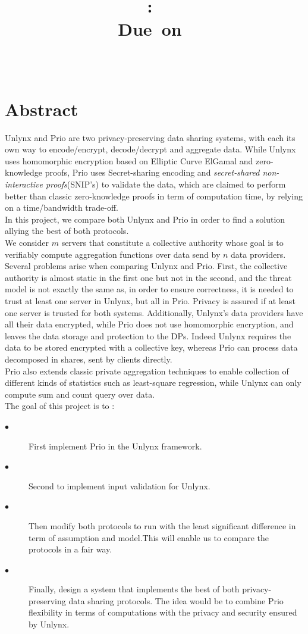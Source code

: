 \documentclass{article}
\title{
\logoepfl
\vspace{2in}
\textmd{\textbf{\hmwkClass:\ \hmwkTitle}}\\
\normalsize\vspace{0.1in}\small{Due\ on\ \hmwkDueDate}\\
\vspace{0.1in}\large{\textit{\hmwkClassInstructor\ \hmwkClassTime}}
\author{\textbf{\hmwkAuthorName}}
\vspace{3in}
}
\begin{document}
\maketitle

\newpage
\section*{Abstract}
Unlynx and Prio are two privacy-preserving data sharing systems, with each its own way to encode/encrypt, decode/decrypt and aggregate data. While Unlynx \cite{unlynx} uses homomorphic encryption based on Elliptic Curve ElGamal and zero-knowledge proofs, Prio \cite{prio} uses Secret-sharing encoding and \textit{secret-shared non-interactive proofs}(SNIP's) to validate the data, which are claimed to perform better than classic zero-knowledge proofs \cite{proof1,proof2} in term of computation time, by relying on a time/bandwidth trade-off.\\
In this project, we compare both Unlynx and Prio in order to find a solution allying the best of both protocols.\\
We consider $m$ servers that constitute a collective authority whose goal is to verifiably compute aggregation functions over data send by $n$ data providers.\\
Several problems arise when comparing Unlynx and Prio. First, the collective authority is almost static in the first one but not in the second, and the threat model is not exactly the same as, in order to ensure correctness, it is needed to trust at least one server in Unlynx, but all in Prio. Privacy is assured if at least one server is trusted for both systems. Additionally, Unlynx's data providers have all their data encrypted, while Prio does not use homomorphic encryption, and leaves the data storage and protection to the DPs. Indeed Unlynx requires the data to be stored encrypted with a collective key, whereas Prio can process data decomposed in shares, sent by clients directly.\\
Prio also extends classic private aggregation techniques to enable collection of different kinds of statistics such as least-square regression, while Unlynx can only compute sum and count query over data.\\
The goal of this project is to :
\begin{description}
\item[$\bullet$] First implement Prio in the Unlynx framework.
\item[$\bullet$] Second to implement input validation for Unlynx.
\item[$\bullet$]{Then modify both protocols to run with the least significant difference in term of assumption and model.This will enable us to compare the protocols in a fair way.}
\item[$\bullet$] Finally, design a system that implements the best of both privacy-preserving data sharing protocols. The idea would be to combine Prio flexibility in terms of computations with the privacy and security ensured by Unlynx.\\
\end{description}
\end{document}
